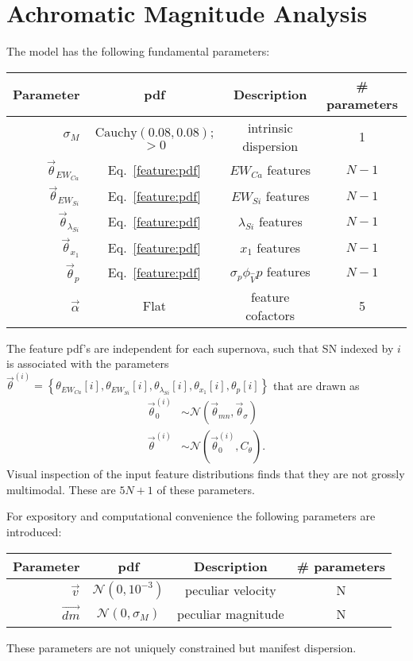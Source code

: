 \documentclass{aastex61}   	%
\begin{document}
\section{Achromatic Magnitude Analysis}

The model has the following fundamental parameters:
\begin{center}
\begin{tabular}{rccc}
\hline
Parameter & pdf & Description & \# parameters\\ \hline
$\sigma_M$ & $\text{Cauchy}(0.08, 0.08)$; $>0$ & intrinsic dispersion & 1\\
$\vec{\theta}_{EW_{Ca}}$ & Eq.~\ref{feature:pdf} & ${EW}_{Ca}$ features & $N-1$ \\
$\vec{\theta}_{EW_{Si}}$ & Eq.~\ref{feature:pdf}& ${EW}_{Si}$ features & $N-1$ \\
$\vec{\theta}_{\lambda_{Si}}$ &Eq.~\ref{feature:pdf}& ${\lambda}_{Si}$ features & $N-1$ \\
$\vec{\theta}_{x_1}$ & Eq.~\ref{feature:pdf}& ${x}_{1}$ features & $N-1$ \\
$\vec{\theta}_{p}$ & Eq.~\ref{feature:pdf}& $\sigma_p\phi_{\hat{V}}  {p} $ features & $N-1$ \\
$\vec{\alpha}$ & Flat& feature cofactors & 5 \\
\hline
\end{tabular}
\end{center}
The feature pdf's are independent for each supernova, such that SN indexed by $i$ is associated with the parameters
$\vec{\theta}^{(i)}=\left\{\theta_{EW_{Ca}}[i], \theta_{EW_{Si}}[i], \theta_{\lambda_{Si}}[i], \theta_{x_1}[i], \theta_{p}[i] \right\}$
that are drawn as
\begin{align}
\vec{\theta}^{(i)}_0 & \sim \mathcal{N}(\vec{\theta}_{\mathit{mn}}, \vec{\theta}_{\sigma})  \nonumber \\
\vec{\theta}^{(i)} & \sim \mathcal{N}(\vec{\theta}^{(i)}_0, C_{\theta}) .
\label{feature:pdf}
\end{align}
Visual inspection of the input feature distributions finds that they are not grossly multimodal.
These are $5N+1$ of these parameters.

For expository and computational convenience the following parameters are introduced:  
\begin{center}
\begin{tabular}{rccc}
\hline
Parameter & pdf & Description & \# parameters\\ \hline
$\vec{v}$ & $\mathcal{N}(0,10^{-3})$ &  peculiar velocity & N \\\
$ \overrightarrow{dm}$ &  $\mathcal{N}(0,\sigma_M)$  &  peculiar magnitude & N \\
\hline
\end{tabular}
\end{center}
These parameters are not uniquely constrained but manifest dispersion.
\end{document}
